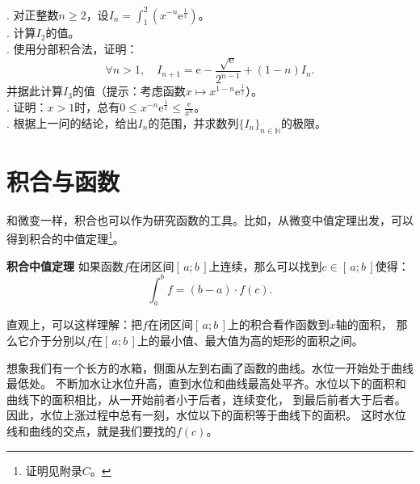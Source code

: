 \documentclass[12pt,UTF8]{ctexbook}
\begin{document}
\begin{xt}
    . 对正整数$n\geqslant 2$，设$\displaystyle I_n = \int_1^2 \left(x^{-n}\mathrm{e}^{\frac{1}{x}}\right)$。\\
    . 计算$I_2$的值。\\
    . 使用分部积合法，证明：
            $$\forall n > 1,\quad I_{n+1} = \mathrm{e} - \frac{\sqrt{\mathrm{e}}}{2^{n-1}} + (1 - n)I_n.$$
    \indent 并据此计算$I_3$的值（提示：考虑函数$x\mapsto x^{1-n}\mathrm{e}^{\frac{1}{x}}$）。\\
    . 证明：$x>1$时，总有$\displaystyle 0\leqslant x^{-n}\mathrm{e}^{\frac{1}{x}} \leqslant \frac{\mathrm{e}}{x^n}$。\\
    . 根据上一问的结论，给出$I_n$的范围，并求数列$\{I_n\}_{n\in\mathbb{N}}$的极限。
\end{xt}

\section{积合与函数}

和微变一样，积合也可以作为研究函数的工具。比如，从微变中值定理出发，可以得到积合的中值定理\footnote{证明见附录$C$。}。

\begin{tm}{\textbf{积合中值定理}}
    如果函数$f$在闭区间$[\,a; b\,]$上连续，那么可以找到$c\in[\,a;b\,]$使得：
    $$ \int_a^b f = (b - a)\cdot f(c).$$
\end{tm}

直观上，可以这样理解：把$f$在闭区间$[\,a; b\,]$上的积合看作函数到$x$轴的面积，
那么它介于分别以$f$在$[\,a; b\,]$上的最小值、最大值为高的矩形的面积之间。

想象我们有一个长方的水箱，侧面从左到右画了函数的曲线。水位一开始处于曲线最低处。
不断加水让水位升高，直到水位和曲线最高处平齐。水位以下的面积和曲线下的面积相比，从一开始前者小于后者，连续变化，
到最后前者大于后者。因此，水位上涨过程中总有一刻，水位以下的面积等于曲线下的面积。
这时水位线和曲线的交点，就是我们要找的$f(c)$。
\end{document}
